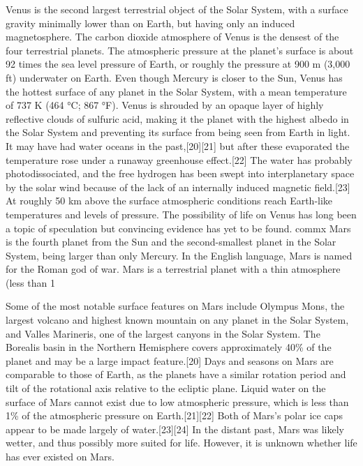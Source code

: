 {Venus is the second largest terrestrial object of the Solar System, with a surface gravity minimally lower than on Earth, but having only an induced magnetosphere. The carbon dioxide atmosphere of Venus is the densest of the four terrestrial planets. The atmospheric pressure at the planet's surface is about 92 times the sea level pressure of Earth, or roughly the pressure at 900 m (3,000 ft) underwater on Earth. Even though Mercury is closer to the Sun, Venus has the hottest surface of any planet in the Solar System, with a mean temperature of 737 K (464 °C; 867 °F). Venus is shrouded by an opaque layer of highly reflective clouds of sulfuric acid, making it the planet with the highest albedo in the Solar System and preventing its surface from being seen from Earth in light. It may have had water oceans in the past,[20][21] but after these evaporated the temperature rose under a runaway greenhouse effect.[22] The water has probably photodissociated, and the free hydrogen has been swept into interplanetary space by the solar wind because of the lack of an internally induced magnetic field.[23] At roughly 50 km above the surface atmospheric conditions reach Earth-like temperatures and levels of pressure. The possibility of life on Venus has long been a topic of speculation but convincing evidence has yet to be found. 
commx Mars is the fourth planet from the Sun and the second-smallest planet in the Solar System, being larger than only Mercury. In the English language, Mars is named for the Roman god of war. Mars is a terrestrial planet with a thin atmosphere (less than 1%

Some of the most notable surface features on Mars include Olympus Mons, the largest volcano and highest known mountain on any planet in the Solar System, and Valles Marineris, one of the largest canyons in the Solar System. The Borealis basin in the Northern Hemisphere covers approximately 40\% of the planet and may be a large impact feature.[20] Days and seasons on Mars are comparable to those of Earth, as the planets have a similar rotation period and tilt of the rotational axis relative to the ecliptic plane. Liquid water on the surface of Mars cannot exist due to low atmospheric pressure, which is less than 1\% of the atmospheric pressure on Earth.[21][22] Both of Mars's polar ice caps appear to be made largely of water.[23][24] In the distant past, Mars was likely wetter, and thus possibly more suited for life. However, it is unknown whether life has ever existed on Mars.
}

